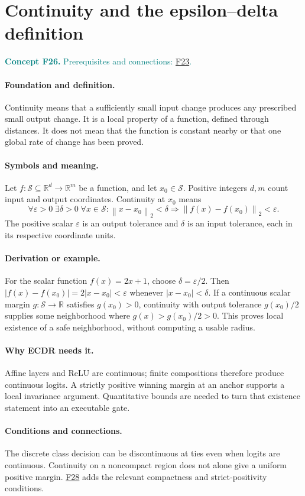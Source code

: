 \documentclass[11pt,a4paper]{article}
\newcommand{\R}{\mathbb R}
\newcommand{\norm}[1]{\left\lVert#1\right\rVert}
\newcommand{\conceptid}{Front matter}
\newcommand{\concept}[3]{\clearpage\renewcommand{\conceptid}{#1}%
\section{#2}\label{concept:#1}%
\textcolor{teal}{\textbf{Concept #1.} Prerequisites and connections: #3.}\par
\typeout{ECDR-CONCEPT-START #1 PAGE=\thepage}}
\begin{document}
\concept{F26}{Continuity and the epsilon--delta definition}{\hyperref[concept:F23]{F23}}
\paragraph{Foundation and definition.}
Continuity means that a sufficiently small input change produces any
prescribed small output change. It is a local property of a function,
defined through distances. It does not mean that the function is
constant nearby or that one global rate of change has been proved.
\paragraph{Symbols and meaning.}
Let $f:\mathcal S\subseteq\R^d\to\R^m$ be a function, and let
$x_0\in\mathcal S$. Positive integers $d,m$ count input and output
coordinates. Continuity at $x_0$ means
\[
 \forall\varepsilon>0\;\exists\delta>0\;\forall x\in\mathcal S:
 \norm{x-x_0}_2<\delta
 \Rightarrow\norm{f(x)-f(x_0)}_2<\varepsilon.
\]
The positive scalar $\varepsilon$ is an output tolerance and $\delta$
is an input tolerance, each in its respective coordinate units.
\paragraph{Derivation or example.}
For the scalar function $f(x)=2x+1$, choose
$\delta=\varepsilon/2$. Then
$|f(x)-f(x_0)|=2|x-x_0|<\varepsilon$ whenever
$|x-x_0|<\delta$. If a continuous scalar margin
$g:\mathcal S\to\R$ satisfies $g(x_0)>0$, continuity with output
tolerance $g(x_0)/2$ supplies some neighborhood where
$g(x)>g(x_0)/2>0$. This proves local existence of
a safe neighborhood, without computing a usable radius.
\paragraph{Why ECDR needs it.}
Affine layers and ReLU are continuous; finite compositions therefore
produce continuous logits. A strictly positive winning margin at an
anchor supports a local invariance argument. Quantitative bounds are
needed to turn that existence statement into an executable gate.
\paragraph{Conditions and connections.}
The discrete class decision can be discontinuous at ties even when
logits are continuous. Continuity on a noncompact region does not alone
give a uniform positive margin. \hyperref[concept:F28]{F28} adds the relevant compactness and
strict-positivity conditions.
\par\label{endconcept:F26}
\end{document}
